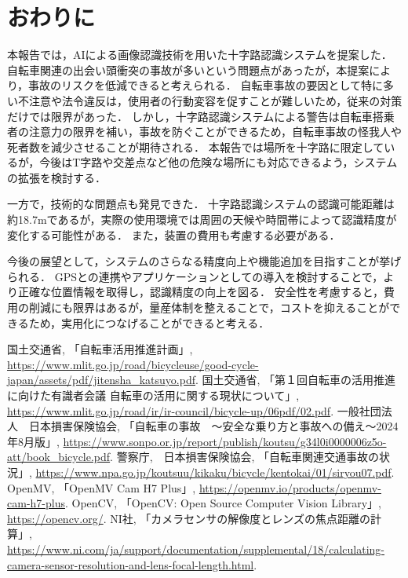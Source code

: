 \documentclass[uplatex,dvipdfmx]{jsarticle}
\begin{document}
\indent

\section{おわりに}
\indent
本報告では，AIによる画像認識技術を用いた十字路認識システムを提案した．
自転車関連の出会い頭衝突の事故が多いという問題点があったが，本提案により，事故のリスクを低減できると考えられる．
自転車事故の要因として特に多い不注意や法令違反は，使用者の行動変容を促すことが難しいため，従来の対策だけでは限界があった．
しかし，十字路認識システムによる警告は自転車搭乗者の注意力の限界を補い，事故を防ぐことができるため，自転車事故の怪我人や死者数を減少させることが期待される．
本報告では場所を十字路に限定しているが，今後はT字路や交差点など他の危険な場所にも対応できるよう，システムの拡張を検討する．
\par
一方で，技術的な問題点も発見できた．
十字路認識システムの認識可能距離は約18.7mであるが，実際の使用環境では周囲の天候や時間帯によって認識精度が変化する可能性がある．
また，装置の費用も考慮する必要がある．
\par
今後の展望として，システムのさらなる精度向上や機能追加を目指すことが挙げられる．
GPSとの連携やアプリケーションとしての導入を検討することで，より正確な位置情報を取得し，認識精度の向上を図る．
安全性を考慮すると，費用の削減にも限界はあるが，量産体制を整えることで，コストを抑えることができるため，実用化につなげることができると考える．



\begin{thebibliography}{9}
 国土交通省, 「自転車活用推進計画」, \url{https://www.mlit.go.jp/road/bicycleuse/good-cycle-japan/assets/pdf/jitensha_katsuyo.pdf}.
  国土交通省, 「第１回自転車の活用推進に向けた有識者会議 自転車の活用に関する現状について」, \url{https://www.mlit.go.jp/road/ir/ir-council/bicycle-up/06pdf/02.pdf}.
 一般社団法人　日本損害保険協会, 「自転車の事故　〜安全な乗り方と事故への備え〜2024年8月版」, \url{https://www.sonpo.or.jp/report/publish/koutsu/g34l0i0000006z5o-att/book_bicycle.pdf}.
 警察庁,　日本損害保険協会, 「自転車関連交通事故の状況」, \url{https://www.npa.go.jp/koutsuu/kikaku/bicycle/kentokai/01/siryou07.pdf}.
 OpenMV, 「OpenMV Cam H7 Plus」, \url{https://openmv.io/products/openmv-cam-h7-plus}.
 OpenCV, 「OpenCV: Open Source Computer Vision Library」, \url{https://opencv.org/}.
 NI社, 「カメラセンサの解像度とレンズの焦点距離の計算」, \url{https://www.ni.com/ja/support/documentation/supplemental/18/calculating-camera-sensor-resolution-and-lens-focal-length.html}.

\end{thebibliography}
\end{document}
